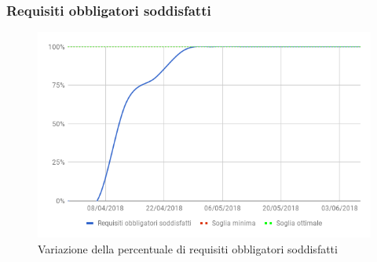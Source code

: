 		\subsubsection{Requisiti obbligatori soddisfatti}
		
		\begin{figure}[H]{\textwidth}
  			\centering
  			\includegraphics[width=1\linewidth]{./img/Risultati/RequisitiObbligatoriSoddisfatti.png}
	  		\caption[Variazione requisiti obbligatori soddisfatti]{Variazione della percentuale di requisiti obbligatori soddisfatti}
		\end{figure}
